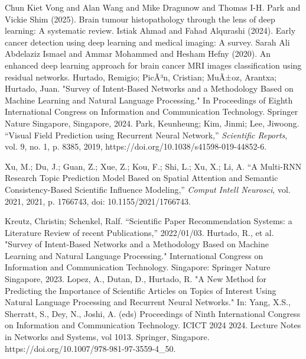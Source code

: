 \documentclass[runningheads]{llncs}
\begin{document}
\begin{thebibliography}{00}
     Chun Kiet Vong and Alan Wang and Mike Dragunow and Thomas I-H. Park and Vickie Shim (2025). Brain tumour histopathology through the lens of deep learning: A systematic review.
 Istiak Ahmad and Fahad Alqurashi (2024). Early cancer detection using deep learning and medical imaging: A survey.
 Sarah Ali {Abdelaziz Ismael} and Ammar Mohammed and Hesham Hefny (2020). An enhanced deep learning approach for brain cancer MRI images classification using residual networks.
    Hurtado, Remigio; PicÃ³n, Cristian; MuÃ±oz, Arantxa; Hurtado, Juan.
    "Survey of Intent-Based Networks and a Methodology Based on Machine Learning and Natural Language Processing."
    In Proceedings of Eighth International Congress on Information and Communication Technology.
    Springer Nature Singapore, Singapore, 2024.
    Park, Keunheung; Kim, Jinmi; Lee, Jiwoong. 
    ``Visual Field Prediction using Recurrent Neural Network,'' 
    \emph{Scientific Reports}, 
    vol. 9, no. 1, p. 8385, 
    2019, 
    https://doi.org/10.1038/s41598-019-44852-6.
    
    Xu, M.; Du, J.; Guan, Z.; Xue, Z.; Kou, F.; Shi, L.; Xu, X.; Li, A. 
    ``A Multi-RNN Research Topic Prediction Model Based on Spatial Attention and Semantic Consistency-Based Scientific Influence Modeling,'' 
    \emph{Comput Intell Neurosci}, 
    vol. 2021, 
    2021, 
    p. 1766743, 
    doi: 10.1155/2021/1766743.
    
    Kreutz, Christin; Schenkel, Ralf.
    ``Scientific Paper Recommendation Systems: a Literature Review of recent Publications,''
    2022/01/03.
	 Hurtado, R., et al. "Survey of Intent-Based Networks and a Methodology Based on Machine Learning and Natural Language Processing." International Congress on Information and Communication Technology. Singapore: Springer Nature Singapore, 2023.
     Lopez, A., Dutan, D., Hurtado, R. "A New Method for Predicting the Importance of Scientific Articles on Topics of Interest Using Natural Language Processing and Recurrent Neural Networks." In: Yang, X.S., Sherratt, S., Dey, N., Joshi, A. (eds) Proceedings of Ninth International Congress on Information and Communication Technology. ICICT 2024 2024. Lecture Notes in Networks and Systems, vol 1013. Springer, Singapore. https://doi.org/10.1007/978-981-97-3559-4\_50.
\end{thebibliography}
\end{document}
